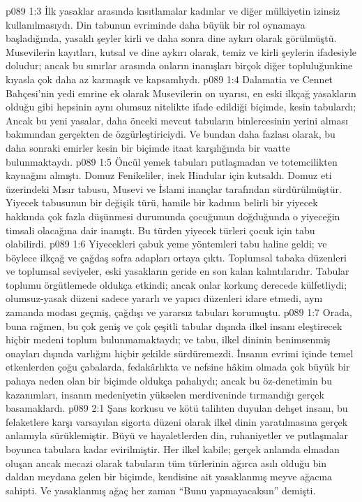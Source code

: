\vs p089 1:3 İlk yasaklar arasında kısıtlamalar kadınlar ve diğer mülkiyetin izinsiz kullanılmasıydı. Din tabunun evriminde daha büyük bir rol oynamaya başladığında, yasaklı şeyler kirli ve daha sonra dine aykırı olarak görülmüştü. Musevilerin kayıtları, kutsal ve dine aykırı olarak, temiz ve kirli şeylerin ifadesiyle doludur; ancak bu sınırlar arasında onların inanışları birçok diğer topluluğunkine kıyasla çok daha az karmaşık ve kapsamlıydı.
\vs p089 1:4 Dalamatia ve Cennet Bahçesi’nin yedi emrine ek olarak Musevilerin on uyarısı, en eski ilkçağ yasakların olduğu gibi hepsinin aynı olumsuz nitelikte ifade edildiği biçimde, kesin tabulardı; Ancak bu yeni yasalar, daha önceki mevcut tabuların binlercesinin yerini alması bakımından gerçekten de özgürleştiriciydi. Ve bundan daha fazlası olarak, bu daha sonraki emirler kesin bir biçimde itaat karşılığında bir vaatte bulunmaktaydı.
\vs p089 1:5 Öncül yemek tabuları putlaşmadan ve totemcilikten kaynağını almıştı. Domuz Fenikeliler, inek Hindular için kutsaldı. Domuz eti üzerindeki Mısır tabusu, Musevi ve İslami inançlar tarafından sürdürülmüştür. Yiyecek tabusunun bir değişik türü, hamile bir kadının belirli bir yiyecek hakkında çok fazla düşünmesi durumunda çocuğunun doğduğunda o yiyeceğin timsali olacağına dair inanıştı. Bu türden yiyecek türleri çocuk için tabu olabilirdi.
\vs p089 1:6 Yiyecekleri çabuk yeme yöntemleri tabu haline geldi; ve böylece ilkçağ ve çağdaş sofra adapları ortaya çıktı. Toplumsal tabaka düzenleri ve toplumsal seviyeler, eski yasakların geride en son kalan kalıntılarıdır. Tabular toplumu örgütlemede oldukça etkindi; ancak onlar korkunç derecede külfetliydi; olumsuz\hyp{}yasak düzeni sadece yararlı ve yapıcı düzenleri idare etmedi, aynı zamanda modası geçmiş, çağdışı ve yararsız tabuları korumuştu.
\vs p089 1:7 Orada, buna rağmen, bu çok geniş ve çok çeşitli tabular dışında ilkel insanı eleştirecek hiçbir medeni toplum bulunmamaktaydı; ve tabu, ilkel dininin benimsenmiş onayları dışında varlığını hiçbir şekilde sürdüremezdi. İnsanın evrimi içinde temel etkenlerden çoğu çabalarda, fedakârlıkta ve nefsine hâkim olmada çok büyük bir pahaya neden olan bir biçimde oldukça pahalıydı; ancak bu öz\hyp{}denetimin bu kazanımları, insanın medeniyetin yükselen merdiveninde tırmandığı gerçek basamaklardı.
\vs p089 2:1 Şans korkusu ve kötü talihten duyulan dehşet insanı, bu felaketlere karşı varsayılan sigorta düzeni olarak ilkel dinin yaratılmasına gerçek anlamıyla sürüklemiştir. Büyü ve hayaletlerden din, ruhaniyetler ve putlaşmalar boyunca tabulara kadar evirilmiştir. Her ilkel kabile; gerçek anlamda elmadan oluşan ancak mecazi olarak tabuların tüm türlerinin ağırca asılı olduğu bin daldan meydana gelen bir biçimde, kendisine ait yasaklanmış meyve ağacına sahipti. Ve yasaklanmış ağaç her zaman “Bunu yapmayacaksın” demişti.
